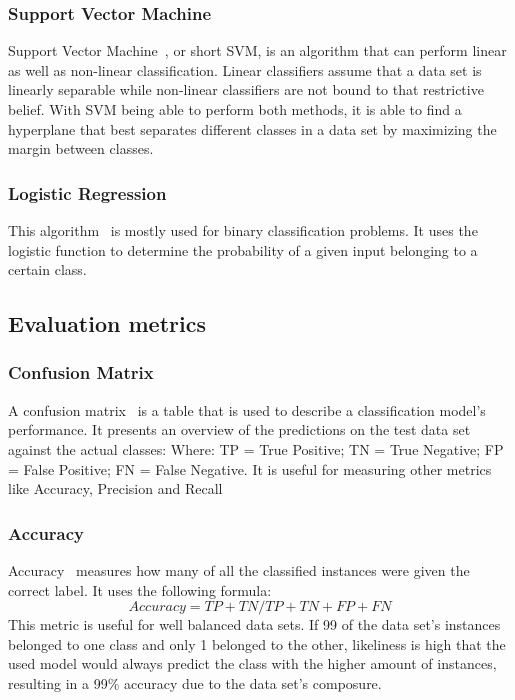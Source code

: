 \subsubsection{Support Vector Machine}
Support Vector Machine~\cite{svm}, or short SVM, is an algorithm that can perform linear as well as non-linear classification. Linear classifiers assume that a data set is linearly separable while non-linear classifiers are not bound to that restrictive belief. With SVM being able to perform both methods, it is able to find a hyperplane that best separates different classes in a data set by maximizing the margin between classes. 

\subsubsection{Logistic Regression}
This algorithm~\cite{logistic_regression} is mostly used for binary classification problems. It uses the logistic function to determine the probability of a given input belonging to a certain class.

\subsection{Evaluation metrics}

\subsubsection{Confusion Matrix}
A confusion matrix~\cite{evaluation_metrics} is a table that is used to describe a classification model's performance. It presents an overview of the predictions on the test data set against the actual classes:
Where:
TP = True Positive; TN = True Negative; FP = False Positive; FN = False Negative.
It is useful for measuring other metrics like Accuracy, Precision and Recall

\subsubsection{Accuracy}
Accuracy~\cite{evaluation_metrics} measures how many of all the classified instances were given the correct label.
It uses the following formula:
\[ Accuracy = {TP + TN}/{TP + TN + FP + FN} \]
This metric is useful for well balanced data sets. If 99 of the data set's instances belonged to one class and only 1 belonged to the other, likeliness is high that the used model would always predict the class with the higher amount of instances, resulting in a 99\% accuracy due to the data set's composure.


